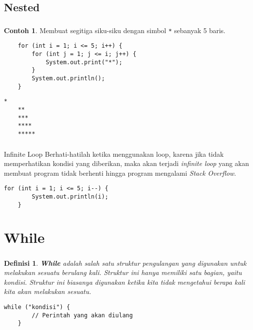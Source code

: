 \documentclass[aspectratio=169]{beamer}
\newtheorem*{definisi}{Definisi}
\theoremstyle{definition}
\newtheorem*{contoh}{Contoh}
\begin{document}
    \subsection{Nested}
    \begin{frame}[fragile]
        \frametitle{\insertsection}
        \framesubtitle{\insertsubsection}
        \begin{contoh}
            Membuat segitiga siku-siku dengan simbol \texttt{*} sebanyak 5 baris.
        \end{contoh}
        \begin{lstlisting}
    for (int i = 1; i <= 5; i++) {
        for (int j = 1; j <= i; j++) {
            System.out.print("*");
        }
        System.out.println();
    }
        \end{lstlisting}
        \begin{lstlisting}[style=output]
    *
    **
    ***
    ****
    *****
        \end{lstlisting}
    \end{frame}

    \begin{frame}[fragile]
        \frametitle{\insertsection}
        \begin{alertblock}{Infinite Loop}
            Berhati-hatilah ketika menggunakan loop, karena jika tidak memperhatikan kondisi yang diberikan, maka akan terjadi \textit{infinite loop} yang akan membuat program tidak berhenti hingga program mengalami \textit{Stack Overflow}.
        \end{alertblock}
        \begin{lstlisting}[caption={Infinite Loop},firstnumber=6]
    for (int i = 1; i <= 5; i--) {
        System.out.println(i);
    }
        \end{lstlisting}
    \end{frame}

    \section{While}
    \begin{frame}[fragile]
        \frametitle{\insertsection}
        \begin{definisi}
            \textbf{While} adalah salah satu struktur pengulangan yang digunakan untuk melakukan sesuatu berulang kali. Struktur ini hanya memiliki satu bagian, yaitu kondisi. Struktur ini biasanya digunakan ketika kita tidak mengetahui berapa kali kita akan melakukan sesuatu.
        \end{definisi}
        \begin{lstlisting}[caption={Syntax While}, numbers=none]
    while ("kondisi") {
        // Perintah yang akan diulang
    }
        \end{lstlisting}
    \end{frame}
\end{document}
